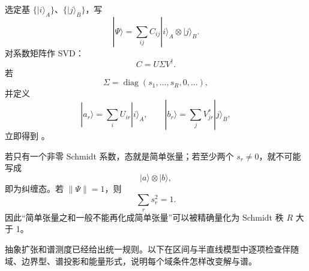选定基 $\{|i\rangle_A\}$、$\{|j\rangle_B\}$，写
\[
|\Psi\rangle=\sum_{ij}C_{ij}|i\rangle_A\otimes|j\rangle_B.
\]
对系数矩阵作 SVD：
\[
C=U\Sigma V^\dagger.
\]
若
\[
\Sigma=\operatorname{diag}(s_1,\ldots,s_R,0,\ldots),
\]
并定义
\[
|a_r\rangle=\sum_iU_{ir}|i\rangle_A,
\qquad
|b_r\rangle=\sum_jV_{jr}^*|j\rangle_B,
\]
立即得到 。

若只有一个非零 Schmidt 系数，态就是简单张量；若至少两个 $s_r\neq0$，就不可能写成
\[
|a\rangle\otimes|b\rangle,
\]
即为纠缠态。若 $\|\Psi\|=1$，则
\[
\sum_rs_r^2=1.
\]
因此“简单张量之和一般不能再化成简单张量”可以被精确量化为 Schmidt 秩 $R$ 大于 1。




抽象扩张和谱测度已经给出统一规则。以下在区间与半直线模型中逐项检查伴随域、边界型、谱投影和能量形式，说明每个域条件怎样改变解与谱。














